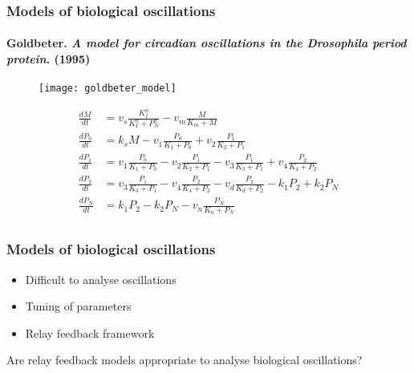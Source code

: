 \documentclass[11pt]{beamer}
\begin{document}

\begin{frame}%
\frametitle{Models of biological oscillations}
\framesubtitle{Goldbeter. \emph{A model for circadian oscillations in the Drosophila period protein}. (1995) }

\begin{figure}
\texttt{[image: goldbeter\_model]}
\end{figure}

\begin{center}
\tiny
\begin{align*}
%
\frac{dM}{dt}   &= v_s\frac{K_I^n}{K_I^n + P_N^n} - v_m\frac{M}{K_m + M} \\
\frac{dP_0}{dt} &= k_sM - v_1\frac{P_0}{K_1 + P_0} + v_2\frac{P_1}{K_2 + P_1} \\
\frac{dP_1}{dt} &= v_1\frac{P_0}{K_1 + P_0} - v_2\frac{P_1}{K_2 + P_1} - v_3\frac{P_1}{K_3 + P_1} + v_4\frac{P_2}{K_4 + P_2} \\
\frac{dP_2}{dt} &= v_3\frac{P_1}{K_3 + P_1} - v_4\frac{P_2}{K_4 + P_2} - v_d\frac{P_2}{K_d + P_2} - k_1P_2 + k_2P_N\\
\frac{dP_N}{dt} &= k_1P_2 - k_2P_N -v_n\frac{P_N}{K_n + P_N}\\
%
%
\end{align*}

\end{center}

\end{frame}

\begin{frame}
\frametitle{Models of biological oscillations}
\begin{itemize}
\item Difficult to analyse oscillations
\item Tuning of parameters
\item Relay feedback framework
\end{itemize}

Are relay feedback models appropriate to analyse biological oscillations?
\end{frame}
\end{document}
